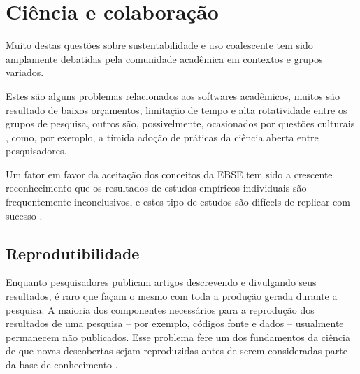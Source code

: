 \section{Ciência e colaboração}

Muito destas questões sobre sustentabilidade e uso coalescente tem sido
amplamente debatidas pela comunidade acadêmica em contextos e grupos variados.

Estes são alguns problemas relacionados aos softwares acadêmicos, muitos são
resultado de baixos orçamentos, limitação de tempo e alta rotatividade entre os
grupos de pesquisa, outros são, possivelmente, ocasionados por questões
culturais \cite{niemeyer2017open}, como, por exemplo, a tímida adoção de
práticas da ciência aberta entre pesquisadores.

Um fator em favor da aceitação dos conceitos da EBSE tem sido a crescente
reconhecimento que os resultados de estudos empíricos individuais são frequentemente
inconclusivos, e estes tipo de estudos são difícels de replicar com sucesso
\cite{sjoberg2005survey}.

\subsection{Reprodutibilidade}

Enquanto pesquisadores publicam artigos descrevendo e divulgando seus
resultados, é raro que façam o mesmo com toda a produção gerada durante a
pesquisa. A maioria dos componentes necessários para a reprodução dos
resultados de uma pesquisa -- por exemplo, códigos fonte e dados -- usualmente
permanecem não publicados. Esse problema fere um dos fundamentos
da ciência de que novas descobertas sejam reproduzidas antes de serem
consideradas parte da base de conhecimento \cite{Stodden2009}.

%


